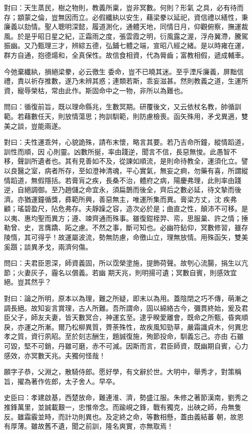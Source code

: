 \begin{pinyinscope}
 對曰：天生蒸民，樹之物則，教義所稟，豈非冥數。何則？形氣
 之具，必有待而存；顓蒙之倫，豈無因而立。必假纖紈以安生，藉梁豢以延祀，資信禮以繕性，秉廉義以劾情。聖人聰明深懿，履道測化，通體天地，同情日月，仰觀俯察，撫運裁風。於是乎昭日星之紀，正霜雨之度，張雲霞之明，衍風露之渥，浮舟翼滯，騰駕振幽。又乃甄理三才，辨綜五德，弘鋪七體之端，宣昭八經之緒。是以時雍在運，群方自通，抱德煬和，全真保性。故信食相資，代為脣齒；富教相假，遞成輔車。



 今弛棄纖紈，損絕梁豢，必云徼生
 委命，豈不已曉其迷。至乎湮斥廉義，屏黜信禮，責以祈存推數，遂乃未辨其惑；連類若斯，乖妄滋甚。然則教義之道，生運所資，寵辱榮枯，常由此作。斯固命中之一物，非所以為難也。



 問曰：循復前旨，既以理命縣兆，生數冥期。研覆後文，又云依杖名教，帥循訓範。若藉數任天，則放情蕩思；拘訓馴範，則防慮檢喪。函矢殊用，矛戈異適，雙美之談，豈能兩遂。



 對曰：夫性運乖舛，心貌詭殊，請布末懷，略言其要。若乃吉命所鐘，縱情蹈道，訓性而順，因
 心則靈。凶數所挻，率由踐逆，聞言不信，長惡無悛。此愚智不移，聲訓所遺者也。其有見善如不及，從諫如順流，是則命待教全，運須化立。譬以良醫之室，病者所存，至如澄神清魂，平心實氣，無妄之痾，勿藥有喜，所謂縱情蹈道，無假隱括。若膏肓之疾，長桑不治，體府之病，陽慶弗理，此則率由踐逆，自絕調御。至乃趙儲之命宜永，須扁鵲而後全，齊后之數必延，待文摯而後濟。亦猶運鐘循獎，彞範所興，善惡無主，唯運所集而異。膏梁方丈，沈
 疾弗顧；瑤碧盈尺，阽危弗存。夫靜躁之容，造次必於是；曲直之性，顛沛不可移。是以夷、惠均聖而異方；遵、竦齊通而殊事。雖復鉗桎羿、帟，思服巢、許之情；捶勒曾、史，言膺蹻、跖之慮。不然之事，斷可知也。必幽符鉆仰，冥數修習，雖存陵惰，其可得乎！故運屬波流，勢無防慮，命徼山立，理無放情。用殊函矢，雙美奚躓；談異矛戈，兩濟何傷。



 問曰：夫君臣恩深，師資義固，所以霑榮塗施，提飾荷聲。故刳心流腸，捐生以亢節；火妻灰子，霾名以償義。若幽
 期天兆，則明揚可遺；冥數自賓，則感效宜絕。豈其然乎？



 對曰：論之所明，原本以為理，難之所疑，即末以為用。蓋陰閉之巧不傳，萌漸之調長絕。故知妄言賞理，古人所難。吾所謂命，固以綿絡古今，彌貫終始，爰及君臣父子，師友夫妻，皆天數冥合，神運玄至。逮乎睽愛離會，既命之所甄，昏爽順戾，亦運之所漸。爾乃松柳異質，薺荼殊性，故疾風知勁草，嚴霜識貞木，何異忠孝之質，資行夙昭。至於刻志酬生，題誠復施，殉節投命，馴義忘己。亦由
 石雖可毀，堅不可銷，丹雖可磨，赤不可滅。因斯而言，君臣師資，既幽期自賓，心力感效，亦冥數天兆。夫獨何怪哉！



 願字子恭，父淵之，散騎侍郎。愿好學，有文辭於世。大明中，舉秀才，對策稱旨，擢為著作佐郎，太子舍人。早卒。



 史臣曰：孝建啟基，西楚放命，難連淮、濟，勢盛江服。朱修之著節漢南，劉秀之推鋒萬里，並誠載艱一，忠惟帝念。而踰峴之鋒，戰有獨克，出硤之師，舟無隻反。雖霜霰並時，而計功則異也。及定終之命，等數相懸，蓋由義結蕃
 朝，故恩有厚薄。雖故舊不遺，聞之前訓，隆名爽實，亦無取焉！



\end{pinyinscope}